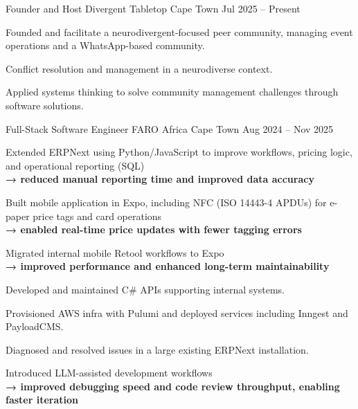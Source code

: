 \begin{cventries}  
  
  \cventry
  {Founder and Host}
  {Divergent Tabletop}
  {Cape Town}
  {Jul 2025 -- Present}
  {  
    \begin{cvitems}  
      \item Founded and facilitate a neurodivergent-focused peer community, managing event operations and a WhatsApp-based community.
      \item Conflict resolution and management in a neurodiverse context.
      \item Applied systems thinking to solve community management challenges through software solutions.
    \end{cvitems}
  }
  
  \cventry
  {Full-Stack Software Engineer}
  {FARO Africa}
  {Cape Town}
  {Aug 2024 -- Nov 2025}
  {  
    \begin{cvitems}  
      \item Extended ERPNext using Python/JavaScript to improve workflows, pricing logic, and operational reporting (SQL) \\ \textbf{→ reduced manual reporting time and improved data accuracy}
      \item Built mobile application in Expo, including NFC (ISO 14443-4 APDUs) for e-paper price tags and card operations \\ \textbf{→ enabled real-time price updates with fewer tagging errors}
      \item Migrated internal mobile Retool workflows to Expo \\ \textbf{→ improved performance and enhanced long-term maintainability}
      \item Developed and maintained C\# APIs supporting internal systems.
      \item Provisioned AWS infra with Pulumi and deployed services including Inngest and PayloadCMS.
      \item Diagnosed and resolved issues in a large existing ERPNext installation.
      \item Introduced LLM-assisted development workflows \\ \textbf{→ improved debugging speed and code review throughput, enabling faster iteration}
    \end{cvitems}
  }
  

\end{cventries}
